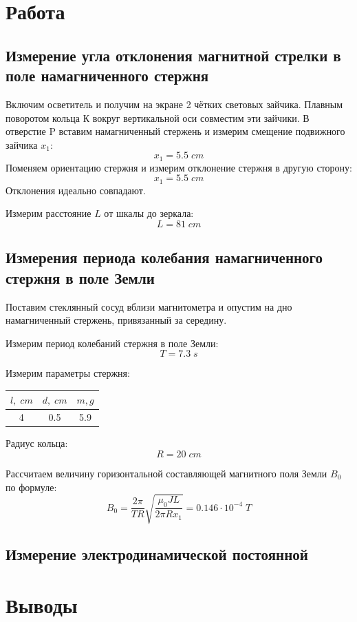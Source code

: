 \documentclass{article}
\begin{document}
\section{Работа}
\subsection{Измерение угла отклонения магнитной стрелки в поле намагниченного стержня}
Включим осветитель и получим на экране 2 чётких световых зайчика. Плавным поворотом кольца К вокруг вертикальной
оси совместим эти зайчики. В отверстие P вставим намагниченный стержень и измерим смещение подвижного зайчика \(x_1\):
\[ x_1 = 5.5\; cm \]
Поменяем ориентацию стержня и измерим отклонение стержня в другую сторону:
\[ x_1 = 5.5\; cm \]
Отклонения идеально совпадают.

Измерим расстояние \(L\) от шкалы до зеркала:
\[ L = 81\; cm \]

\subsection{Измерения периода колебания намагниченного стержня в поле Земли}

Поставим стеклянный сосуд вблизи магнитометра и опустим на дно намагниченный стержень, привязанный за середину.

Измерим период колебаний стержня в поле Земли:
\[ T = 7.3\; s\]

Измерим параметры стержня:
\begin{table}[H]
    \centering
    \begin{tabular}{|c|c|c|}
    \hline
    \(l,\; cm\) & \(d, \; cm\) & \(m, g\) \\\hline
    4 & 0.5 & 5.9 \\\hline        
    \end{tabular}
\end{table}

Радиус кольца:
\[ R = 20\; cm \]

Рассчитаем величину горизонтальной составляющей магнитного поля Земли \(B_0\) по формуле:
\[ B_0 = \frac{2\pi}{TR}\sqrt{\frac{\mu_0JL}{2\pi Rx_1}} = 0.146\cdot10^{-4}\; T \]

\subsection{Измерение электродинамической постоянной}

\section{Выводы}
\end{document}
